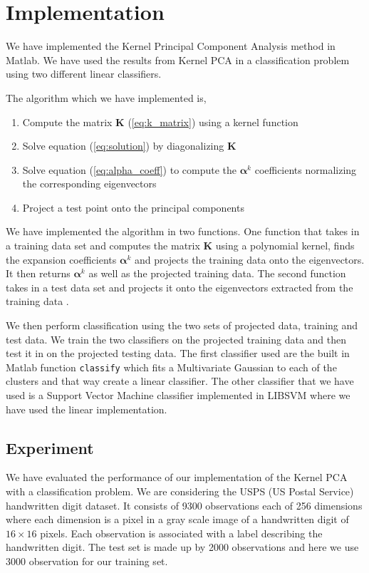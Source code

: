 \section{Implementation}

We have implemented the Kernel Principal Component Analysis method in Matlab. We have used the results from Kernel PCA in a classification problem using two different linear classifiers.

The algorithm which we have implemented is,

\begin{enumerate}
    \item Compute the matrix \textbf{K} (\ref{eq:k_matrix}) using a kernel function
    \item Solve equation (\ref{eq:solution}) by diagonalizing \textbf{K}
    \item Solve equation (\ref{eq:alpha_coeff}) to compute the $\boldsymbol{\alpha}^k$ coefficients normalizing the corresponding eigenvectors
    \item Project a test point onto the principal components
\end{enumerate}

We have implemented the algorithm in two functions. One function that takes in a training data set and computes the matrix \textbf{K} using a polynomial kernel, finds the expansion coefficients $\boldsymbol{\alpha}^k$ and projects the training data onto the eigenvectors. It then returns $\boldsymbol{\alpha}^k$ as well as the projected training data. The second function  takes in a test data set and projects it onto the eigenvectors extracted from the training data	.

We then perform classification using the two sets of projected data, training and test data. We train the two classifiers on the projected training data and then test it in on the projected testing data.
The first classifier used are the built in Matlab function \texttt{classify} which fits a Multivariate Gaussian to each of the clusters and that way create a linear classifier. The other classifier that we have used is a Support Vector Machine classifier implemented in LIBSVM \cite{CC01a} where we have used the linear implementation.

\subsection{Experiment}
We have evaluated the performance of our implementation of the Kernel PCA with a classification problem. We are considering the USPS (US Postal Service) handwritten digit dataset. It consists of 9300 observations each of 256 dimensions where each dimension is a pixel in a gray scale image of a handwritten digit of $16\times 16$ pixels. 
Each observation is associated with a label describing the handwritten digit. The test set is made up by 2000 observations and here we use 3000 observation for our training set. 

